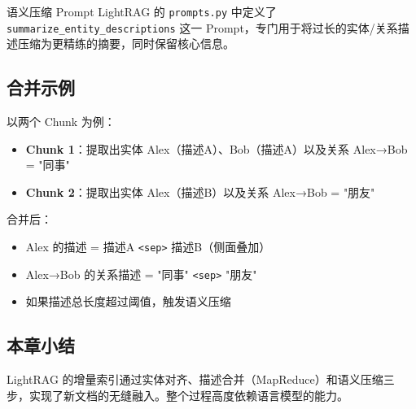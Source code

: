 \begin{importantbox}{语义压缩 Prompt}
LightRAG 的 \texttt{prompts.py} 中定义了 \texttt{summarize\_entity\_descriptions} 这一 Prompt，专门用于将过长的实体/关系描述压缩为更精练的摘要，同时保留核心信息。
\end{importantbox}

\subsection{合并示例}

以两个 Chunk 为例：
\begin{itemize}
    \item \textbf{Chunk 1}：提取出实体 Alex（描述A）、Bob（描述A）以及关系 Alex→Bob = "同事"
    \item \textbf{Chunk 2}：提取出实体 Alex（描述B）以及关系 Alex→Bob = "朋友"
\end{itemize}

合并后：
\begin{itemize}
    \item Alex 的描述 = 描述A \texttt{<sep>} 描述B（侧面叠加）
    \item Alex→Bob 的关系描述 = "同事" \texttt{<sep>} "朋友"
    \item 如果描述总长度超过阈值，触发语义压缩
\end{itemize}

\subsection{本章小结}

LightRAG 的增量索引通过实体对齐、描述合并（MapReduce）和语义压缩三步，实现了新文档的无缝融入。整个过程高度依赖语言模型的能力。


